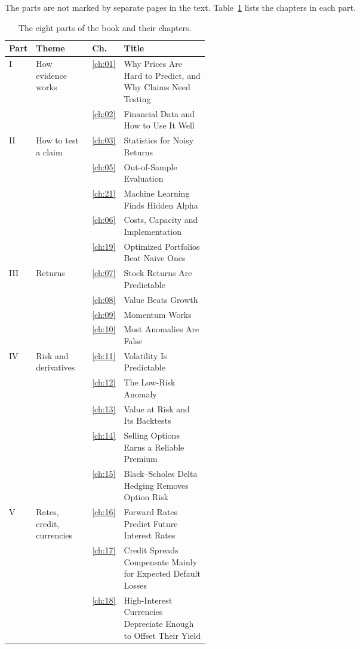 The parts are not marked by separate pages in the text. Table~\ref{tab:pref-parts} lists the chapters in each part.

\begin{table}[htbp]
\centering
\small
\caption{The eight parts of the book and their chapters.}
\label{tab:pref-parts}
\begin{tabularx}{0.95\linewidth}{@{}>{\raggedright\arraybackslash}p{0.07\linewidth}>{\raggedright\arraybackslash}p{0.28\linewidth}>{\raggedleft\arraybackslash}p{0.04\linewidth}>{\raggedright\arraybackslash}X@{}}
\toprule
Part & Theme & Ch. & Title \\
\midrule
I & How evidence works & \ref{ch:01} & Why Prices Are Hard to Predict, and Why Claims Need Testing \\
 &  & \ref{ch:02} & Financial Data and How to Use It Well \\
\addlinespace
II & How to test a claim & \ref{ch:03} & Statistics for Noisy Returns \\
 &  & \ref{ch:05} & Out-of-Sample Evaluation \\
 &  & \ref{ch:21} & Machine Learning Finds Hidden Alpha \\
 &  & \ref{ch:06} & Costs, Capacity and Implementation \\
 &  & \ref{ch:19} & Optimized Portfolios Beat Naive Ones \\
\addlinespace
III & Returns & \ref{ch:07} & Stock Returns Are Predictable \\
 &  & \ref{ch:08} & Value Beats Growth \\
 &  & \ref{ch:09} & Momentum Works \\
 &  & \ref{ch:10} & Most Anomalies Are False \\
\addlinespace
IV & Risk and derivatives & \ref{ch:11} & Volatility Is Predictable \\
 &  & \ref{ch:12} & The Low-Risk Anomaly \\
 &  & \ref{ch:13} & Value at Risk and Its Backtests \\
 &  & \ref{ch:14} & Selling Options Earns a Reliable Premium \\
 &  & \ref{ch:15} & Black--Scholes Delta Hedging Removes Option Risk \\
\addlinespace
V & Rates, credit, currencies & \ref{ch:16} & Forward Rates Predict Future Interest Rates \\
 &  & \ref{ch:17} & Credit Spreads Compensate Mainly for Expected Default Losses \\
 &  & \ref{ch:18} & High-Interest Currencies Depreciate Enough to Offset Their Yield \\

\end{tabularx}
\end{table}
